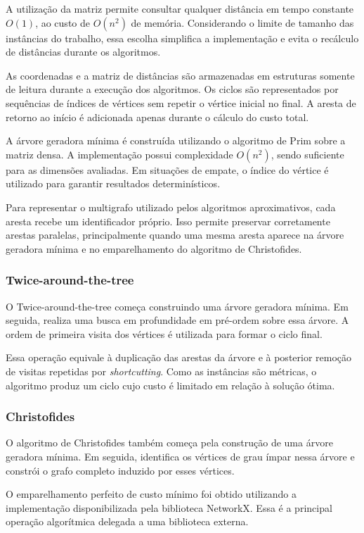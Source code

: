 \documentclass[12pt]{article}
\begin{document}
A utilização da matriz permite consultar qualquer distância em tempo constante $O(1)$, ao custo de $O(n^2)$ de memória. Considerando o limite de tamanho das instâncias do trabalho, essa escolha simplifica a implementação e evita o recálculo de distâncias durante os algoritmos.

As coordenadas e a matriz de distâncias são armazenadas em estruturas somente de leitura durante a execução dos algoritmos. Os ciclos são representados por sequências de índices de vértices sem repetir o vértice inicial no final. A aresta de retorno ao início é adicionada apenas durante o cálculo do custo total.

A árvore geradora mínima é construída utilizando o algoritmo de Prim sobre a matriz densa. A implementação possui complexidade $O(n^2)$, sendo suficiente para as dimensões avaliadas. Em situações de empate, o índice do vértice é utilizado para garantir resultados determinísticos.

Para representar o multigrafo utilizado pelos algoritmos aproximativos, cada aresta recebe um identificador próprio. Isso permite preservar corretamente arestas paralelas, principalmente quando uma mesma aresta aparece na árvore geradora mínima e no emparelhamento do algoritmo de Christofides.

\subsubsection{Twice-around-the-tree}

O Twice-around-the-tree começa construindo uma árvore geradora mínima. Em seguida, realiza uma busca em profundidade em pré-ordem sobre essa árvore. A ordem de primeira visita dos vértices é utilizada para formar o ciclo final.

Essa operação equivale à duplicação das arestas da árvore e à posterior remoção de visitas repetidas por \emph{shortcutting}. Como as instâncias são métricas, o algoritmo produz um ciclo cujo custo é limitado em relação à solução ótima.

\subsubsection{Christofides}

O algoritmo de Christofides também começa pela construção de uma árvore geradora mínima. Em seguida, identifica os vértices de grau ímpar nessa árvore e constrói o grafo completo induzido por esses vértices.

O emparelhamento perfeito de custo mínimo foi obtido utilizando a implementação disponibilizada pela biblioteca NetworkX. Essa é a principal operação algorítmica delegada a uma biblioteca externa.
\end{document}
